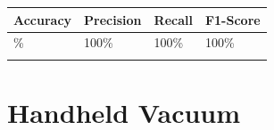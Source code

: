 
{\def\LTcaptype{none} %
\begin{longtable}[]{@{}llll@{}}
\toprule\noalign{}
\textbf{Accuracy} & \textbf{Precision} & \textbf{Recall} &
\textbf{F1-Score} \\
\midrule\noalign{}
\endhead
100\% & 100\% & 100\% & 100\% \\
\bottomrule\noalign{}
\end{longtable}
}

\section{Handheld Vacuum}\label{appendix-e.5.-arc-fault-test-result-for-handheld-vacuum}


